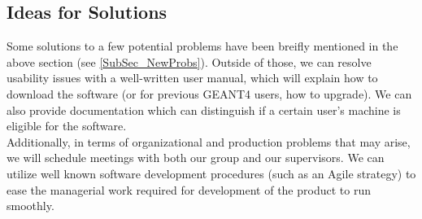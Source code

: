 \documentclass[12pt]{article}
\begin{document}
\subsection{Ideas for Solutions} %
Some solutions to a few potential problems have been breifly mentioned in the above section (see \ref{SubSec_NewProbs}). Outside of those, we can resolve usability issues with a well-written user manual, which will explain how to download the software (or for previous GEANT4 users, how to upgrade). We can also provide documentation which can distinguish if a certain user's machine is eligible for the software. \\
Additionally, in terms of organizational and production problems that may arise, we will schedule meetings with both our group and our supervisors. We can utilize well known software development procedures (such as an Agile strategy) to ease the managerial work required for development of the product to run smoothly.\\
\end{document}
